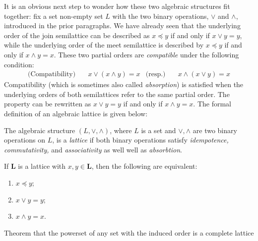 It is an obvious next step to wonder how these two algebraic structures fit together: fix a set non-empty
set $L$ with the two binary operations, $\vee$ and $\wedge$, introduced in the prior paragraphs. We
have already seen that the underlying order of the join semilattice can be described as
$x \preceq y$ if and only if $x \vee y = y$, while the underlying order of the meet semilattice is described
by $x \preceq y$ if and only if $x \wedge y = x$. These two partial orders are \textit{compatible} under
the following condition:
\begin{align}
  \text{(Compatibility)} & \quad x \vee (x \wedge y) = x & \text{(resp.)} & \quad x \wedge (x \vee y) = x
\end{align}
%
Compatibility (which is sometimes also called \textit{absorption}) is satisfied when the underlying orders
of both semilattices refer to the same partial order. The property can be rewritten as
$x \vee y = y$ if and only if $x \wedge y = x$. The formal definition of an algebraic lattice is given
below:

\begin{definition}
  \label{definition:algebraic-lattice} The algebraic structure $(L, \vee, \wedge )$, where $L$ is a
  set and $\vee, \wedge$ are two binary operations on $L$, is a \emph{lattice} if both binary
  operations satisfy \textit{idempotence, commutativity,} and \textit{associativity} as well well as
  \textit{absorbtion}.
\end{definition}

\begin{lemma}
  \label{lemma:the-connecting-lemma} If $\mathbf{L}$ is a lattice with $x, y \in \mathbf{L}$, then
  the following are equivalent:
  \begin{enumerate}
    \setlength{\itemsep}{0pt}
    \setlength{\parsep}{0pt}

    \item $x \preceq y$;

    \item $x \vee y = y$;

    \item $x \wedge y = x$.
  \end{enumerate}
\end{lemma}

\begin{theorem}
  \label{theorem:powerset-lattice} Theorem that the powerset of any set with the induced order is a complete
  lattice
\end{theorem}

